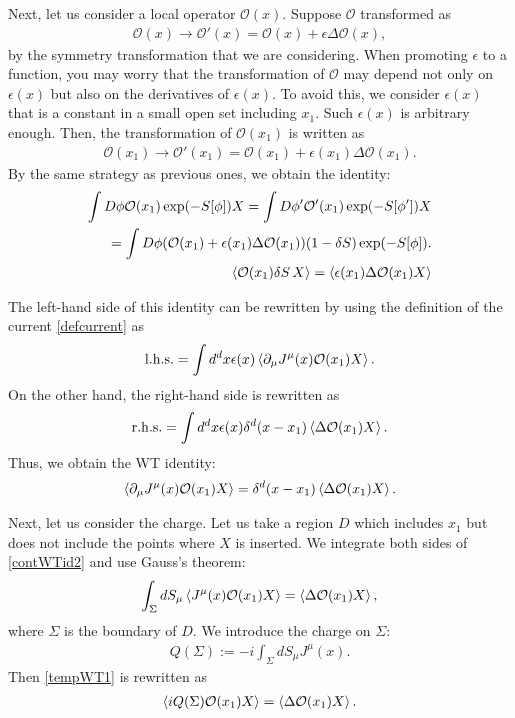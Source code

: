 \documentclass[12pt]{scrartcl}
\newcommand{\del}{\partial}
\newcommand{\Ocal}{\mathcal{O}}
\begin{document}
Next, let us consider a local operator $\Ocal(x)$.  Suppose $\Ocal$ transformed as
\begin{align}
    \Ocal(x)\to \Ocal'(x)=\Ocal(x)+\epsilon \Delta \Ocal(x),
\end{align}
by the symmetry transformation that we are considering.  When promoting $\epsilon$ to a function, you may worry that the transformation of $\Ocal$ may depend not only on $\epsilon(x)$ but also on the derivatives of $\epsilon(x)$.  To avoid this, we consider $\epsilon(x)$ that is a constant in a small open set including $x_1$.  Such $\epsilon(x)$ is arbitrary enough.  Then, the transformation of $\Ocal(x_1)$ is written as
\begin{align}
    \Ocal(x_1)\to \Ocal'(x_1)=\Ocal(x_1)+\epsilon(x_1) \Delta \Ocal(x_1).
\end{align}
By the same strategy as previous ones, we obtain the identity:
\begin{align}
    \int D\phi \Ocal(x_1)\exp(-S[\phi])X
    =\int D\phi' \Ocal'(x_1)\exp(-S[\phi'])X\nonumber\\
    =\int D\phi (\Ocal(x_1)+\epsilon(x_1)\Delta \Ocal(x_1))(1-\delta S)\exp(-S[\phi]).\nonumber\\
    \expval{\Ocal(x_1)\delta S\, X}
    =\expval{\epsilon(x_1)\Delta \Ocal(x_1)X} \label{tempWT0}
\end{align}


The left-hand side of this identity can be rewritten by using the definition of the current \eqref{defcurrent} as
\begin{align}
    \mathrm{l.h.s.}=\int d^dx \epsilon(x)\expval{\del_{\mu}J^{\mu}(x)\Ocal(x_1)X}.
\end{align}
On the other hand, the right-hand side is rewritten as
\begin{align}
    \mathrm{r.h.s.}=\int d^dx \epsilon(x)\delta^d(x-x_1)\expval{\Delta \Ocal(x_1)X}.
\end{align}
Thus, we obtain the WT identity:
\begin{align}
    \expval{\del_{\mu}J^{\mu}(x) \Ocal(x_1)X}=\delta^d(x-x_1)\expval{\Delta \Ocal(x_1)X}.
    \label{contWTid2}
\end{align}

Next, let us consider the charge.  Let us take a region $D$ which includes $x_1$ but does not include the points where $X$ is inserted. We integrate both sides of \eqref{contWTid2} and use Gauss's theorem:
\begin{align}
    \int_{\Sigma}dS_{\mu}\expval{J^{\mu}(x)\Ocal(x_1)X}=\expval{\Delta \Ocal(x_1)X},\label{tempWT1}
\end{align}
where $\Sigma$ is the boundary of $D$.  We introduce the charge on $\Sigma$:
\begin{align}
    Q(\Sigma):=-i\int_{\Sigma}dS_{\mu} J^{\mu}(x).\label{charge}
\end{align}
Then \eqref{tempWT1} is rewritten as
\begin{align}
    \expval{iQ(\Sigma)\Ocal(x_1)X}=
    \expval{\Delta \Ocal(x_1)X}.
    \label{tempWT2}
\end{align}
\end{document}

